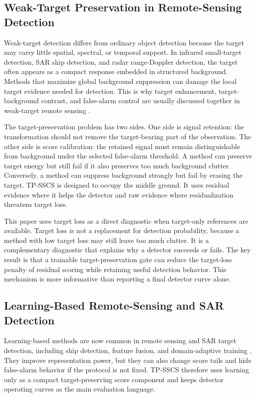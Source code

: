 \documentclass[journal]{IEEEtran}
\begin{document}
\subsection{Weak-Target Preservation in Remote-Sensing Detection}

Weak-target detection differs from ordinary object detection because the target may carry little spatial, spectral, or temporal support. In infrared small-target detection, SAR ship detection, and radar range-Doppler detection, the target often appears as a compact response embedded in structured background. Methods that maximize global background suppression can damage the local target evidence needed for detection. This is why target enhancement, target-background contrast, and false-alarm control are usually discussed together in weak-target remote sensing \cite{panagopoulos2004smalltarget,liu2020polsarcfar,wang2019ssdd,leng2023rawsar}.

The target-preservation problem has two sides. One side is signal retention: the transformation should not remove the target-bearing part of the observation. The other side is score calibration: the retained signal must remain distinguishable from background under the selected false-alarm threshold. A method can preserve target energy but still fail if it also preserves too much background clutter. Conversely, a method can suppress background strongly but fail by erasing the target. TP-SSCS is designed to occupy the middle ground. It uses residual evidence where it helps the detector and raw evidence where residualization threatens target loss.

This paper uses target loss as a direct diagnostic when target-only references are available. Target loss is not a replacement for detection probability, because a method with low target loss may still leave too much clutter. It is a complementary diagnostic that explains why a detector succeeds or fails. The key result is that a trainable target-preservation gate can reduce the target-loss penalty of residual scoring while retaining useful detection behavior. This mechanism is more informative than reporting a final detector curve alone.

\subsection{Learning-Based Remote-Sensing and SAR Detection}

Learning-based methods are now common in remote sensing and SAR target detection, including ship detection, feature fusion, and domain-adaptive training \cite{wang2019ssdd,zhang2021ssdd,leng2023rawsar}. They improve representation power, but they can also change score tails and hide false-alarm behavior if the protocol is not fixed. TP-SSCS therefore uses learning only as a compact target-preserving score component and keeps detector operating curves as the main evaluation language.
\end{document}
